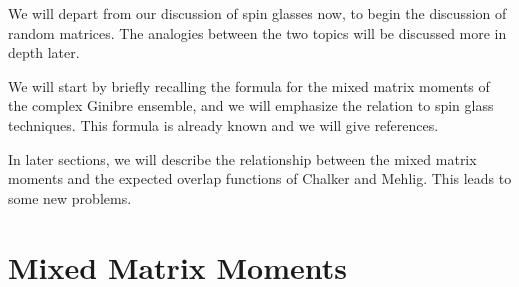 \documentclass[12pt]{report}
\theoremstyle{definition}
\begin{document}
We will depart from our discussion of spin glasses now, to begin the discussion of random matrices.  The analogies between the two topics will be discussed more in depth later.  

We will start by briefly recalling the formula for the mixed matrix moments of the complex Ginibre ensemble, and we will emphasize the relation to spin glass techniques.
This formula is already known and we will give references.  

In later sections, we will describe the relationship between the mixed matrix moments and the expected overlap functions of Chalker and Mehlig.  This leads to some new problems.  



\section{Mixed Matrix Moments}
\end{document}
